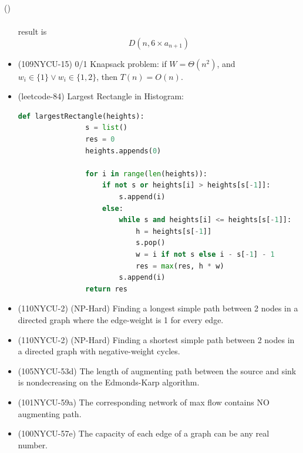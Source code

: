 \begin{theorem}{()}
\begin{itemize}
\begin{equation}
\begin{aligned}
            \end{aligned}
        \end{equation} result is \begin{equation}
            D(n, 6 \times a_{n + 1})
        \end{equation}
        \item (109NYCU-15) 0/1 Knapsack problem: if $W = \Theta(n^2)$, and $w_i \in \{1\} \lor w_i \in \{1, 2\}$, then $T(n) = O(n)$.
        \item (leetcode-84) Largest Rectangle in Histogram: \begin{lstlisting}[caption={Largest Rectangle in Histogram.}, captionpos=b, language=Python]
            def largestRectangle(heights):
                s = list()
                res = 0
                heights.appends(0)
                
                for i in range(len(heights)):
                    if not s or heights[i] > heights[s[-1]]:
                        s.append(i)
                    else:
                        while s and heights[i] <= heights[s[-1]]:
                            h = heights[s[-1]]
                            s.pop()
                            w = i if not s else i - s[-1] - 1
                            res = max(res, h * w)
                        s.append(i)
                return res
        \end{lstlisting}
        \item (110NYCU-2) (NP-Hard) Finding a longest simple path between 2 nodes in a directed graph where the edge-weight is 1 for every edge.
        \item (110NYCU-2) (NP-Hard) Finding a shortest simple path between 2 nodes in a directed graph with negative-weight cycles.
        \item (105NYCU-53d) The length of augmenting path between the source and sink is nondecreasing on the Edmonds-Karp algorithm.
        \item (101NYCU-59a) The corresponding network of max flow contains NO augmenting path.
        \item (100NYCU-57e) The capacity of each edge of a graph can be any real number.
    \end{itemize}
\end{theorem}
